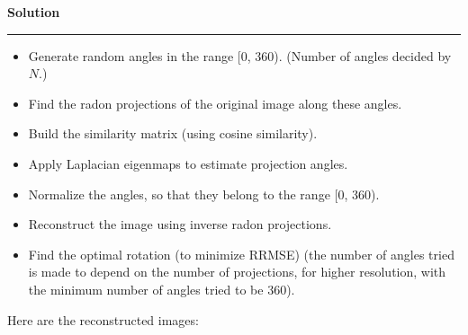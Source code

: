 \documentclass[a4paper,12pt]{article}
\newenvironment{solution}[2][]{%
    \begin{mdframed}[linecolor=blue!70!black, linewidth=2pt, roundcorner=10pt, backgroundcolor=yellow!10!white, skipabove=12pt, skipbelow=12pt]%
        \textbf{\large #2}
        \par\noindent\rule{\textwidth}{0.4pt}
}{
    \end{mdframed}
}
\begin{document}
\begin{solution}{Solution}
  \begin{itemize}
    \item Generate random angles in the range [0, 360). (Number of angles decided by $N$.)
    \item Find the radon projections of the original image along these angles.
    \item Build the similarity matrix (using cosine similarity).
    \item Apply Laplacian eigenmaps to estimate projection angles.
    \item Normalize the angles, so that they belong to the range [0, 360).
    \item Reconstruct the image using inverse radon projections.
    \item Find the optimal rotation (to minimize RRMSE) (the number of angles tried is made to depend on the number of projections, for higher resolution, with the minimum number of angles tried to be 360).
  \end{itemize}

  \clearpage

  Here are the reconstructed images:




\end{solution}
\end{document}

